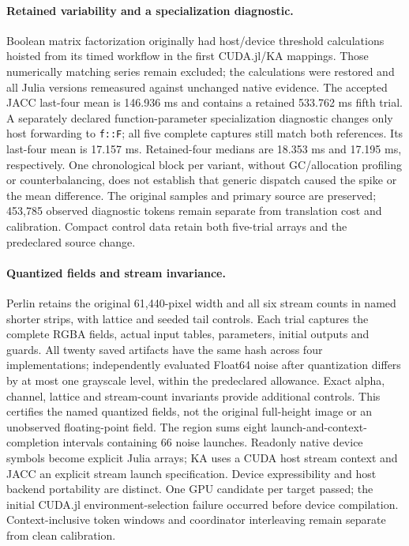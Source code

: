 \paragraph{Retained variability and a specialization diagnostic.}
Boolean matrix factorization originally had host/device threshold calculations hoisted from its timed workflow in the first CUDA.jl/KA mappings. Those numerically matching series remain excluded; the calculations were restored and all Julia versions remeasured against unchanged native evidence. The accepted JACC last-four mean is 146.936 ms and contains a retained 533.762 ms fifth trial. A separately declared function-parameter specialization diagnostic changes only host forwarding to \texttt{f::F}; all five complete captures still match both references. Its last-four mean is 17.157 ms. Retained-four medians are 18.353 ms and 17.195 ms, respectively. One chronological block per variant, without GC/allocation profiling or counterbalancing, does not establish that generic dispatch caused the spike or the mean difference. The original samples and primary source are preserved; 453,785 observed diagnostic tokens remain separate from translation cost and calibration. Compact control data retain both five-trial arrays and the predeclared source change.

\paragraph{Quantized fields and stream invariance.}
Perlin retains the original 61,440-pixel width and all six stream counts in named shorter strips, with lattice and seeded tail controls. Each trial captures the complete RGBA fields, actual input tables, parameters, initial outputs and guards. All twenty saved artifacts have the same hash across four implementations; independently evaluated Float64 noise after quantization differs by at most one grayscale level, within the predeclared allowance. Exact alpha, channel, lattice and stream-count invariants provide additional controls. This certifies the named quantized fields, not the original full-height image or an unobserved floating-point field. The region sums eight launch-and-context-completion intervals containing 66 noise launches. Readonly native device symbols become explicit Julia arrays; KA uses a CUDA host stream context and JACC an explicit stream launch specification. Device expressibility and host backend portability are distinct. One GPU candidate per target passed; the initial CUDA.jl environment-selection failure occurred before device compilation. Context-inclusive token windows and coordinator interleaving remain separate from clean calibration.

